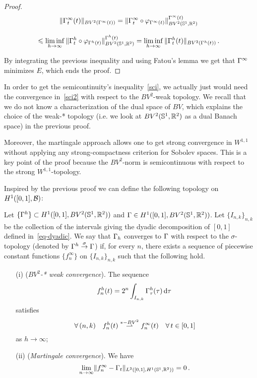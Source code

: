 \begin{proof}
\begin{multline}\label{sci}
	\| \GA^{\infty}_t(t)\|_{BV^2(\GA^\infty(t))}
	=  \| \GA^\infty_t \circ \phi_{\GA^\infty(t)} \|^{\GA^{\infty}(t)}_{BV^2(\Circ,\RR^2)} \vspace{0.3cm}\\
	\leq \underset{h\rightarrow \infty}{\liminf} \, \| \GA^h_t \circ \phi_{\GA^h (t)}\|^{\GA^h(t)}_{BV^2(\Circ,\RR^2)}
	= \underset{h\rightarrow \infty}{\liminf} \,\|\GA^{h}_t(t)\|_{BV^2(\GA^h(t))}\,.
\end{multline}

By integrating the previous inequality and using Fatou's lemma we get that $\Gamma^\infty$ minimizes $E$, which ends the proof.
\end{proof}

\begin{rem} In order to get the semicontinuity's inequality~\eqref{sci}, we actually just would need the convergence in~\eqref{sci2} with respect to the $BV^2$-weak topology. We recall that we do not know a characterization of the dual space of $BV$, which explains the choice of the weak-* topology (i.e. we look at $BV^2(\mathbb{S}^1,\mathbb{R}^2)$ as a dual Banach space) in the previous proof. 

Moreover,  the martingale approach allows one to get strong convergence in  $W^{1,1}$ without applying any strong-compactness criterion for Sobolev spaces. This is a key point of the proof because the $BV^2$-norm  is semicontinuous with respect to the strong $W^{1,1}$-topology. 
\end{rem}

Inspired by the previous proof we can define the following topology on $H^1([0,1],\mathcal{B})$:

\begin{defn}\label{sigma} Let $\{\Gamma^h\}\subset H^1([0,1],BV^2(\mathbb{S}^1,\mathbb{R}^2))$ and $\Gamma\in H^1([0,1],BV^2(\mathbb{S}^1,\mathbb{R}^2))$. Let $\{I_{n,k}\}_{n,k}$ be the collection of the intervals giving the dyadic decomposition of $[0,1]$ defined in~\eqref{eq-dyadic}. We say that $\Gamma_h$ converges to $\Gamma$ with respect to the $\sigma$-topology (denoted by $\Gamma^h\overset{\sigma}{\rightarrow}\Gamma$) if, for every $n$,  there exists a sequence of piecewise constant functions $\{f_n^\infty\}$ on  $\{I_{n,k}\}_{n,k}$  such that the following hold.
\begin{itemize}
\item[(i)] ({\em $BV^2$-* weak convergence}).  The sequence $$f_{n}^h(t)=2^n \int_{I_{n,k}} \Gamma^h_\tau(\tau)\, \mathrm{d} \tau  \,$$
satisfies
$$\forall \, (n,k) \quad f^h_n(t) \overset{*-BV^2}{\rightharpoonup} f^\infty_n(t) \quad \forall \, t\in [0,1]$$
as $h\rightarrow \infty$; 
\item[(ii)] ({\em Martingale convergence}). We have
$$\underset{n\rightarrow \infty}{\lim}\|f_n^\infty - \Gamma_t\|_{L^2([0,1],H^1(\mathbb{S}^1,\mathbb{R}^2))}=0\,.$$
\end{itemize}
\end{defn}

